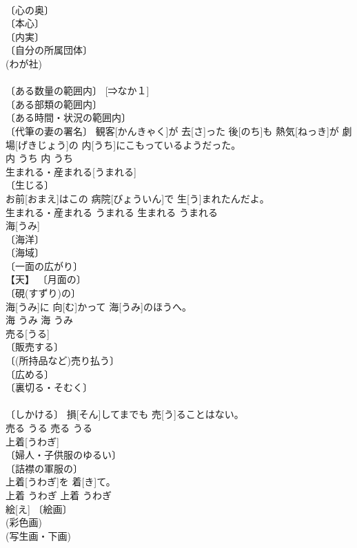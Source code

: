 \documentclass[8pt]{extreport}
\begin{document}
\begin{CJK}{UTF8}{min}
\\	〔心の奥〕 
\\	〔本心〕 
\\	〔内実〕 
\\	〔自分の所属団体〕 
\\	(わが社) 
\\	[⇒うち２] 
\\	〔ある数量の範囲内〕 [⇒なか１] 
\\	〔ある部類の範囲内〕 
\\	〔ある時間・状況の範囲内〕 
\\	〔代筆の妻の署名〕	観客[かんきゃく]が 去[さ]った 後[のち]も 熱気[ねっき]が 劇場[げきじょう]の 内[うち]にこもっているようだった。	
\\	内	うち	内	うち	
\\	生まれる・産まれる[うまれる]	
\\	〔生じる〕 
\\	お前[おまえ]はこの 病院[びょういん]で 生[う]まれたんだよ。	
\\	生まれる・産まれる	うまれる	生まれる	うまれる	
\\	海[うみ]	
\\	〔海洋〕 
\\	〔海域〕 
\\	〔一面の広がり〕 
\\	【天】 〔月面の〕 
\\	〔硯(すずり)の〕 
\\	海[うみ]に 向[む]かって 海[うみ]のほうへ。	
\\	海	うみ	海	うみ	
\\	売る[うる]	
\\	〔販売する〕 
\\	〔(所持品など)売り払う〕 
\\	〔広める〕 
\\	〔裏切る・そむく〕 
\\	[＝うらぎる] 
\\	〔しかける〕	損[そん]してまでも 売[う]ることはない。	
\\	売る	うる	売る	うる	
\\	上着[うわぎ]	
\\	〔婦人・子供服のゆるい〕 
\\	〔詰襟の軍服の〕 
\\	上着[うわぎ]を 着[き]て。	
\\	上着	うわぎ	上着	うわぎ	
\\	絵[え]	〔絵画〕 
\\	(彩色画) 
\\	(写生画・下画) 

\end{CJK}
\end{document}
